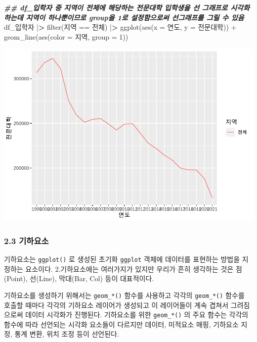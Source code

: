 \documentclass[
]{article}
\newenvironment{Shaded}{\begin{snugshade}}{\end{snugshade}}
\newcommand{\AttributeTok}[1]{\textcolor[rgb]{0.77,0.63,0.00}{#1}}
\newcommand{\DecValTok}[1]{\textcolor[rgb]{0.00,0.00,0.81}{#1}}
\newcommand{\DocumentationTok}[1]{\textcolor[rgb]{0.56,0.35,0.01}{\textbf{\textit{#1}}}}
\newcommand{\ErrorTok}[1]{\textcolor[rgb]{0.64,0.00,0.00}{\textbf{#1}}}
\newcommand{\FunctionTok}[1]{\textcolor[rgb]{0.00,0.00,0.00}{#1}}
\newcommand{\NormalTok}[1]{#1}
\newcommand{\SpecialCharTok}[1]{\textcolor[rgb]{0.00,0.00,0.00}{#1}}
\newcommand{\StringTok}[1]{\textcolor[rgb]{0.31,0.60,0.02}{#1}}
\begin{document}
\begin{Shaded}
\begin{Highlighting}[]
\DocumentationTok{\#\# df\_입학자 중 지역이 전체에 해당하는 전문대학 입학생을 선 그래프로 시각화하는데 지역이 하나뿐이므로 group을 1로 설정함으로써 선그래프를 그릴 수 있음}
\NormalTok{df\_입학자 }\SpecialCharTok{|}\ErrorTok{\textgreater{}} \FunctionTok{filter}\NormalTok{(지역 }\SpecialCharTok{==} \StringTok{\textquotesingle{}전체\textquotesingle{}}\NormalTok{) }\SpecialCharTok{|}\ErrorTok{\textgreater{}}
  \FunctionTok{ggplot}\NormalTok{(}\FunctionTok{aes}\NormalTok{(}\AttributeTok{x =}\NormalTok{ 연도, }\AttributeTok{y =}\NormalTok{ 전문대학)) }\SpecialCharTok{+}
  \FunctionTok{geom\_line}\NormalTok{(}\FunctionTok{aes}\NormalTok{(}\AttributeTok{color =}\NormalTok{ 지역, }\AttributeTok{group =} \DecValTok{1}\NormalTok{))}
\end{Highlighting}
\end{Shaded}

\includegraphics{chap3_files/figure-latex/unnamed-chunk-18-1.pdf}

\hypertarget{uxae30uxd558uxc694uxc18c}{%
\subsubsection{2.3 기하요소}\label{uxae30uxd558uxc694uxc18c}}

기하요소는 \texttt{ggplot()} 로 생성된 초기화 \texttt{ggplot} 객체에 데이터를 표현하는 방법을 지정하는 요소이다. 2.기하요소에는 여러가지가 있지만 우리가 흔히 생각하는 것은 점(Point), 선(Line), 막대(Bar, Col) 등이 대표적이다.

기하요소를 생성하기 위해서는 \texttt{geom\_*()} 함수를 사용하고 각각의 \texttt{geom\_*()} 함수를 호출할 때마다 각각의 기하요소 레이어가 생성되고 이 레이어들이 계속 겹쳐서 그려짐으로써 데이터 시각화가 진행된다. 기하요소를 위한 \texttt{geom\_*()} 의 주요 함수는 각각의 함수에 따라 선언되는 시각화 요소들이 다르지만 데이터, 미적요소 매핑, 기하요소 지정, 통계 변환, 위치 조정 등이 선언된다.
\end{document}
